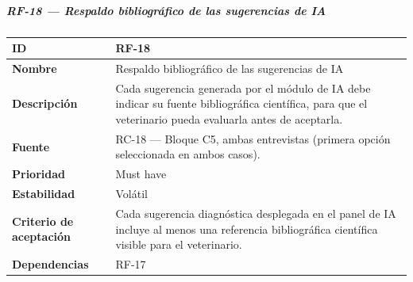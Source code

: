 \subparagraph{RF-18 --- Respaldo bibliográfico de las sugerencias de
IA}\label{rf-18-respaldo-bibliogruxe1fico-de-las-sugerencias-de-ia}

{\def\LTcaptype{none} %
\begin{longtable}[]{@{}
  >{\raggedright\arraybackslash}p{}
  >{\raggedright\arraybackslash}p{}@{}}
\toprule\noalign{}
\begin{minipage}[b]{\linewidth}\raggedright
\textbf{ID}
\end{minipage} & \begin{minipage}[b]{\linewidth}\raggedright
RF-18
\end{minipage} \\
\midrule\noalign{}
\endhead
\bottomrule\noalign{}
\endlastfoot
\textbf{Nombre} & \begin{minipage}[t]{\linewidth}\raggedright
Respaldo bibliográfico de las sugerencias de IA
\end{minipage} \\
\textbf{Descripción} & \begin{minipage}[t]{\linewidth}\raggedright
Cada sugerencia generada por el módulo de IA debe indicar su fuente
bibliográfica científica, para que el veterinario pueda evaluarla antes
de aceptarla.
\end{minipage} \\
\textbf{Fuente} & \begin{minipage}[t]{\linewidth}\raggedright
RC-18 --- Bloque C5, ambas entrevistas (primera opción seleccionada en
ambos casos).
\end{minipage} \\
\textbf{Prioridad} & \begin{minipage}[t]{\linewidth}\raggedright
Must have
\end{minipage} \\
\textbf{Estabilidad} & \begin{minipage}[t]{\linewidth}\raggedright
Volátil
\end{minipage} \\
\textbf{Criterio de aceptación} &
\begin{minipage}[t]{\linewidth}\raggedright
Cada sugerencia diagnóstica desplegada en el panel de IA incluye al
menos una referencia bibliográfica científica visible para el
veterinario.
\end{minipage} \\
\textbf{Dependencias} & \begin{minipage}[t]{\linewidth}\raggedright
RF-17
\end{minipage} \\
\end{longtable}
}

